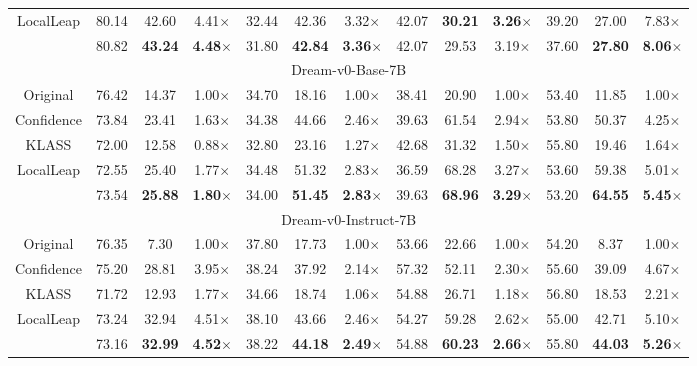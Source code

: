 \begin{table}[t!]
{\begin{tabular}{c*{4}{ccc}}
      LocalLeap & 80.14 & 42.60 & 4.41$\times$ & 32.44 & 42.36 & 3.32$\times$ & 42.07 & \textbf{30.21} & \textbf{3.26$\times$} & 39.20 & 27.00 & 7.83$\times$\\
      \dawn{} & 80.82 & \textbf{43.24} & \textbf{4.48$\times$} & 31.80 & \textbf{42.84} & \textbf{3.36$\times$} & 42.07 & 29.53 & 3.19$\times$ & 37.60 & \textbf{27.80} & \textbf{8.06$\times$} \\
      \midrule
      \multicolumn{13}{c}{Dream-v0-Base-7B}\\
      \midrule
      Original & 76.42 & 14.37 & 1.00$\times$ & 34.70 & 18.16 & 1.00$\times$ & 38.41 & 20.90 & 1.00$\times$ & 53.40 & 11.85 & 1.00$\times$\\
      Confidence & 73.84 & 23.41 & 1.63$\times$ & 34.38 & 44.66 & 2.46$\times$ & 39.63 & 61.54 & 2.94$\times$ & 53.80 & 50.37 & 4.25$\times$\\
      KLASS & 72.00 & 12.58 & 0.88$\times$ & 32.80 & 23.16 & 1.27$\times$ & 42.68 & 31.32 & 1.50$\times$ & 55.80 & 19.46 & 1.64$\times$\\
      LocalLeap & 72.55 & 25.40 & 1.77$\times$ & 34.48 & 51.32 & 2.83$\times$ & 36.59 & 68.28 & 3.27$\times$ & 53.60 & 59.38 & 5.01$\times$\\
      \dawn{} & 73.54 & \textbf{25.88} & \textbf{1.80$\times$} & 34.00 & \textbf{51.45} & \textbf{2.83$\times$} & 39.63 & \textbf{68.96} & \textbf{3.29$\times$} & 53.20 & \textbf{64.55} & \textbf{5.45$\times$} \\
      \midrule 
      \multicolumn{13}{c}{Dream-v0-Instruct-7B}\\
      \midrule
      Original & 76.35 & 7.30 & 1.00$\times$ & 37.80 & 17.73 & 1.00$\times$ & 53.66 & 22.66 & 1.00$\times$ & 54.20 & 8.37 & 1.00$\times$\\
      Confidence & 75.20 & 28.81 & 3.95$\times$ & 38.24 & 37.92 & 2.14$\times$ & 57.32 & 52.11 & 2.30$\times$ & 55.60 & 39.09 & 4.67$\times$\\
      KLASS & 71.72 & 12.93 & 1.77$\times$ & 34.66 & 18.74 & 1.06$\times$ & 54.88 & 26.71 & 1.18$\times$ & 56.80 & 18.53 & 2.21$\times$\\
      LocalLeap & 73.24 & 32.94 & 4.51$\times$ & 38.10 & 43.66 & 2.46$\times$ & 54.27 & 59.28 & 2.62$\times$ & 55.00 & 42.71 & 5.10$\times$\\
      \dawn{} & 73.16 & \textbf{32.99} & \textbf{4.52$\times$} & 38.22 & \textbf{44.18} & \textbf{2.49$\times$} & 54.88 & \textbf{60.23} & \textbf{2.66$\times$} & 55.80 & \textbf{44.03} & \textbf{5.26$\times$} \\
      \bottomrule
    \end{tabular}
  }
\end{table}

